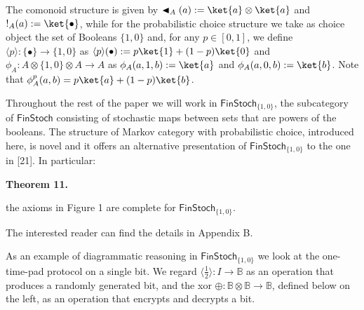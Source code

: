 \documentclass[10pt,a4paper]{article}
\begin{document}
 
 
The comonoid structure is given by $\blacktriangleleft_{A}(a):=\ket{a}\otimes\ket{a}$ and $!_{A}(a):=\ket{\bullet}$, while for the probabilistic choice structure we take as choice object the set of Booleans $\{1,0\}$ and, for any $p\in[0,1]$, we define $\langle p\rangle\colon\{\bullet\}\to\{1,0\}$ as $\langle p\rangle(\bullet):=p\ket{1}+(1-p)\ket{0}$ and $\phi_{A}\colon A\otimes\{1,0\}\otimes A\to A$ as $\phi_{A}(a,1,b):=\ket{a}$ and $\phi_{A}(a,0,b):=\ket{b}$. Note that $\phi^{p}_{A}(a,b)=p\ket{a}+(1-p)\ket{b}$.\par
 
 
 
Throughout the rest of the paper we will work in $\mathsf{FinStoch}_{\{1,0\}}$, the subcategory of $\mathsf{FinStoch}$ consisting of stochastic maps between sets that are powers of the booleans. The structure of Markov category with probabilistic choice, introduced here, is novel and it offers an alternative presentation of $\mathsf{FinStoch}_{\{1,0\}}$ to the one in [21]. In particular:\par
 
 
 
\par\medskip\noindent\textbf{Theorem 11.}\par
 
 
the axioms in Figure 1 are complete for $\mathsf{FinStoch}_{\{1,0\}}$.\par
 
 
 
 
The interested reader can find the details in Appendix B.\par
 
 
 
As an example of diagrammatic reasoning in $\mathsf{FinStoch}_{\{1,0\}}$ we look at the one-time-pad protocol on a single bit. We regard $\langle\frac{1}{2}\rangle\colon I\to\mathbb{B}$ as an operation that produces a randomly generated bit, and the xor $\oplus\colon\mathbb{B}\otimes\mathbb{B}\to\mathbb{B}$, defined below on the left, as an operation that encrypts and decrypts a bit.\par
 
\end{document}
